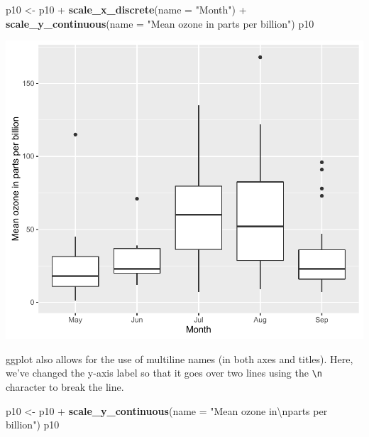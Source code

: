 \documentclass[]{article}
\newenvironment{Shaded}{\begin{snugshade}}{\end{snugshade}}
\newcommand{\KeywordTok}[1]{\textcolor[rgb]{0.13,0.29,0.53}{\textbf{{#1}}}}
\newcommand{\DataTypeTok}[1]{\textcolor[rgb]{0.13,0.29,0.53}{{#1}}}
\newcommand{\CharTok}[1]{\textcolor[rgb]{0.31,0.60,0.02}{{#1}}}
\newcommand{\StringTok}[1]{\textcolor[rgb]{0.31,0.60,0.02}{{#1}}}
\newcommand{\NormalTok}[1]{{#1}}
\begin{document}
\begin{Shaded}
\begin{Highlighting}[]
\NormalTok{p10 <-}\StringTok{ }\NormalTok{p10 +}\StringTok{ }\KeywordTok{scale_x_discrete}\NormalTok{(}\DataTypeTok{name =} \StringTok{"Month"}\NormalTok{) +}
\StringTok{  }\KeywordTok{scale_y_continuous}\NormalTok{(}\DataTypeTok{name =} \StringTok{"Mean ozone in parts per billion"}\NormalTok{)}
\NormalTok{p10}
\end{Highlighting}
\end{Shaded}

\begin{center}\includegraphics{10_Boxplots_pdf/box_2-1} \end{center}

ggplot also allows for the use of multiline names (in both axes and
titles). Here, we've changed the y-axis label so that it goes over two
lines using the \texttt{\textbackslash{}n} character to break the line.

\begin{Shaded}
\begin{Highlighting}[]
\NormalTok{p10 <-}\StringTok{ }\NormalTok{p10 +}\StringTok{ }\KeywordTok{scale_y_continuous}\NormalTok{(}\DataTypeTok{name =} \StringTok{"Mean ozone in}\CharTok{\textbackslash{}n}\StringTok{parts per billion"}\NormalTok{)}
\NormalTok{p10}
\end{Highlighting}
\end{Shaded}
\end{document}
